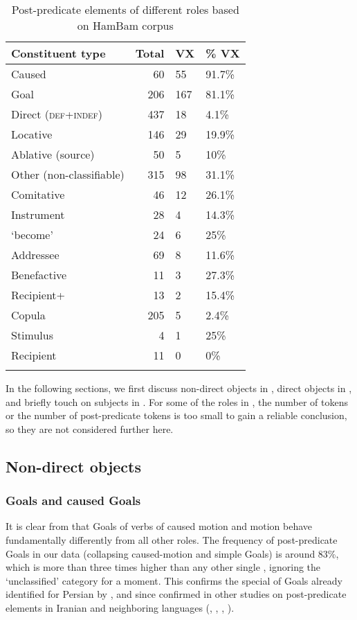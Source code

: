 \documentclass[output=paper,colorlinks,citecolor=brown,draftmode]{langscibook}
\begin{document}
\begin{table}
 \begin{tabularx}{\textwidth}{lrYY}
\lsptoprule
Constituent type & Total & VX & \% VX \\
\midrule
Caused  & 60 & 55 & 91.7\% \\
Goal & 206 & 167 & 81.1\% \\
Direct  (\textsc{def+indef}) & 437 & 18 & 4.1\% \\
Locative & 146 & 29 & 19.9\% \\
Ablative (source) & 50 & 5 & 10\% \\
Other (non-classifiable) & 315 & 98 & 31.1\% \\
Comitative & 46 & 12 & 26.1\% \\
Instrument & 28 & 4 & 14.3\% \\
`become'  & 24 & 6 & 25\% \\
Addressee & 69 & 8 & 11.6\% \\
Benefactive & 11 & 3 & 27.3\% \\
Recipient+ & 13 & 2 & 15.4\% \\
Copula  & 205 & 5 & 2.4\% \\
Stimulus & 4 & 1 & 25\% \\
Recipient & 11 & 0 & 0\% \\
\lspbottomrule
 \end{tabularx}
 \caption{Post-predicate elements of different roles based on HamBam corpus}
 \label{Persian:tab:7}
\end{table}

In the following sections, we first discuss non-direct objects in , direct objects in , and briefly touch on subjects in . For some of the roles in , the number of tokens or the number of post-predicate tokens is too small to gain a reliable conclusion, so they are not considered further here.

\subsection{Non-direct objects}\label{Persian:3.1}

\subsubsection{Goals and caused Goals}

It is clear from  that Goals of verbs of caused motion and motion behave fundamentally differently from all other roles. The frequency of post-predicate Goals in our data (collapsing caused-motion and simple Goals) is around 83\%, which is more than three times higher than any other single , ignoring the `unclassified' category for a moment. This confirms the special  of Goals already identified for Persian by \citet{frommer_post-verbal_1981}, and since confirmed in other studies on post-predicate elements in Iranian and neighboring languages (, \citealt{Jahani2018Post-verbal}, \citealt{stilo_preverbal_2018}, \citealt{Korn2022Targets}).
\end{document}
